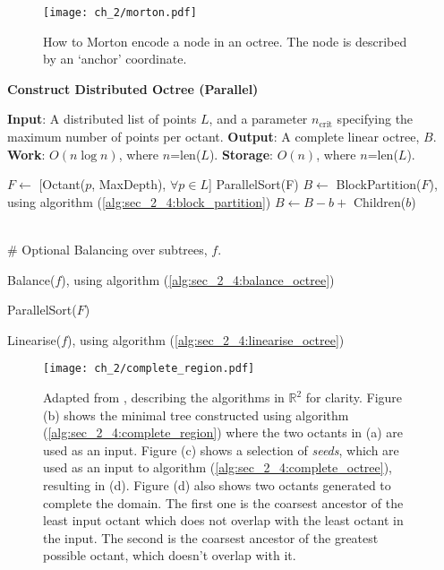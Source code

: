 \begin{figure}
    \centerline{\texttt{[image: ch\_2/morton.pdf]}}
    \caption{How to Morton encode a node in an octree. The node is described by an `anchor' coordinate.}
    \label{fig:sec_2_4:morton}
\end{figure}

\begin{algorithm}
    \caption{\textbf{Construct Distributed Octree (Parallel)}}
    \label{alg:sec_2_4:point2octree}
    \begin{algorithmic}
        \STATE \textbf{Input}: A distributed list of points $L$, and a parameter $n_{\text{crit}}$ specifying the maximum number of points per octant.
        \STATE \textbf{Output}: A complete linear octree, $B$. 
        \STATE \textbf{Work}: $O(n \log n)$, where $n$=len($L$).
        \STATE \textbf{Storage}: $O(n)$, where $n$=len($L$).
        
        \STATE $F \gets $ [Octant($p$, MaxDepth), $\forall p \in L$]
        \STATE ParallelSort(F)
        \STATE $B \gets $ BlockPartition($F$), using algorithm (\ref{alg:sec_2_4:block_partition})
                \STATE $B \gets B - b + $ Children($b$)
            \ENDIF
        \ENDFOR

        \STATE \\\# Optional Balancing over subtrees, $f$.

                \STATE Balance($f$), using algorithm (\ref{alg:sec_2_4:balance_octree})
            \ENDFOR

            \STATE ParallelSort($F$)
            
                \STATE Linearise($f$), using algorithm (\ref{alg:sec_2_4:linearise_octree})
            \ENDFOR
        \ENDIF

    \end{algorithmic}
\end{algorithm}

\begin{figure}
    \centerline{\texttt{[image: ch\_2/complete\_region.pdf]}}
    \caption{Adapted from \cite{sundar2008bottom}, describing the algorithms in $\mathbb{R}^2$ for clarity. Figure (b) shows the minimal tree constructed using algorithm (\ref{alg:sec_2_4:complete_region}) where the two octants in (a) are used as an input. Figure (c) shows a selection of \textit{seeds}, which are used as an input to algorithm (\ref{alg:sec_2_4:complete_octree}), resulting in (d). Figure (d) also shows two octants generated to complete the domain.  The first one is the coarsest ancestor of the least input octant which does not overlap with the least octant in the input. The second is the coarsest ancestor of the greatest possible octant, which doesn't overlap with it.}
    \label{fig:sec_2_4:complete}
\end{figure}


